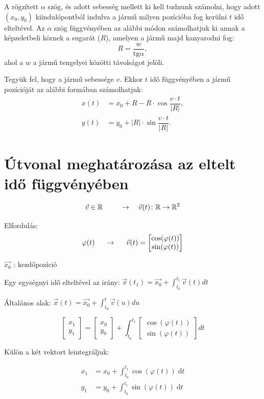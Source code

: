 \documentclass[a4paper]{paper}
\begin{document}
A rögzített $\alpha$ szög, és adott sebesség mellett ki kell tudnunk számolni, hogy adott $(x_0, y_0)$ kiindulópontból indulva a jármű milyen pozícióba fog kerülni $t$ idő elteltével. Az $\alpha$ szög függvényében az alábbi módon számolhatjuk ki annak a képzeletbeli körnek a sugarát ($R$), amelyen a jármű majd kanyarodni fog:
\[
R = \dfrac{w}{\text{tg} \alpha},
\]
ahol a $w$ a jármű tengelyei közötti távolságot jelöli.

Tegyük fel, hogy a jármű sebessége $v$. Ekkor $t$ idő függvényében a jármű pozícióját az alábbi formában számolhatjuk:
\begin{align*}
x(t) &= x_0 + R - R \cdot \cos \dfrac{v \cdot t}{|R|}, \\
y(t) &= y_0 + |R| \cdot \sin \dfrac{v \cdot t}{|R|}.
\end{align*}

\section{Útvonal meghatározása az eltelt idő függvényében}

$$
\vec{v} \in \mathbb{R} \hspace{0.5cm}
\quad \rightarrow \quad
\vec{v} (t) \colon \mathbb{R} \to \mathbb{R}^2
$$

Elfordulás:
$$
\varphi (t) \hspace{0.5cm} \rightarrow \hspace{0.5cm} \vec{v} (t) =
\begin{bmatrix}
\cos(\varphi(t)) \\
\sin(\varphi(t))
\end{bmatrix}
$$

$ \vec{x_0} $ : kezdőpozíció

Egy egységnyi idő elteltével az irány: $ \vec{x} (t_1) = \vec{x_0} + \displaystyle\int_{t_0}^{t_1} \vec{v} (t) dt $

Általános alak:  $ \vec{x} (t) = \vec{x_0} + \displaystyle\int_{t_0}^{t} \vec{v} (u) du $

$$
\begin{bmatrix} x_1 \\ y_1 \end{bmatrix} = \begin{bmatrix} x_0 \\ y_0 \end{bmatrix} + \displaystyle\int_{t_0}^{t_1} \begin{bmatrix} \cos(\varphi(t)) \\ \sin(\varphi(t)) \end{bmatrix} dt
$$

Külön a két vektort leintegráljuk:

\begin{align*}
x_1 &= x_0 + \displaystyle\int_{t_0}^{t_1} \cos(\varphi(t)) \; \mathrm{d}t \\
y_1 &= y_0 + \displaystyle\int_{t_0}^{t_1} \sin(\varphi(t)) \; \mathrm{d}t \\
\end{align*}
\end{document}

